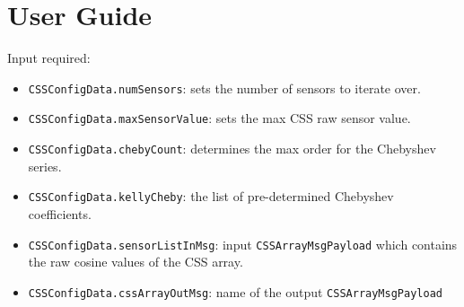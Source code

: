
\section{User Guide}
Input required: 
\begin{itemize}

\item \verb~CSSConfigData.numSensors~: sets the number of sensors to iterate over.
\item  \verb~CSSConfigData.maxSensorValue~: sets the max CSS raw sensor value.
\item \verb~CSSConfigData.chebyCount~: determines the max order for the Chebyshev series.
\item  \verb~CSSConfigData.kellyCheby~: the list of pre-determined Chebyshev coefficients.
\item  \verb~CSSConfigData.sensorListInMsg~:  input \verb~CSSArrayMsgPayload~ which contains the raw cosine values of the CSS array.
\item  \verb~CSSConfigData.cssArrayOutMsg~: name of the output \verb~CSSArrayMsgPayload~

\end{itemize}
